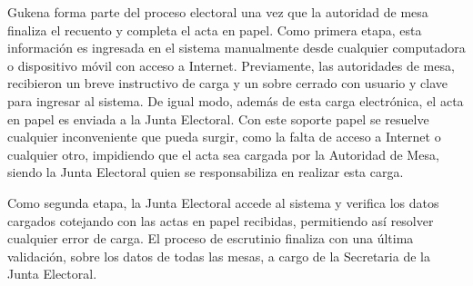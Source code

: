 Gukena forma parte del proceso electoral una vez que la autoridad de mesa finaliza el recuento y completa el acta en papel. Como primera etapa, esta información es ingresada en el sistema manualmente desde cualquier computadora o dispositivo móvil con acceso a Internet. Previamente, las autoridades de mesa, recibieron un breve instructivo de carga y un sobre cerrado con usuario y clave para ingresar al sistema. De igual modo, además de esta carga electrónica, el acta en papel es enviada a la Junta Electoral. Con este soporte papel se resuelve cualquier inconveniente que pueda surgir, como la falta de acceso a Internet o cualquier otro,  impidiendo que el acta sea cargada por la Autoridad de Mesa, siendo la Junta Electoral quien se responsabiliza en realizar esta carga.

Como segunda etapa, la Junta Electoral accede al sistema y verifica los datos cargados cotejando con las actas en papel recibidas, permitiendo así resolver cualquier error de carga. 
El proceso de escrutinio finaliza con una última validación, sobre los datos de todas las mesas, a cargo de la Secretaria de la Junta Electoral.

